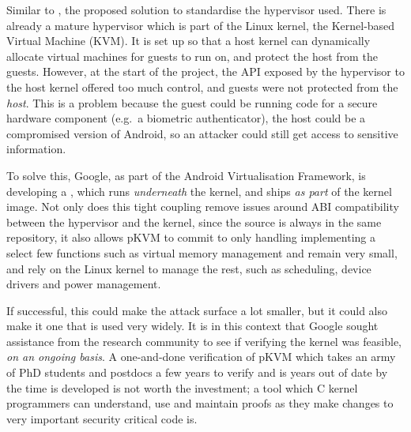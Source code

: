 Similar to , the proposed solution to standardise the hypervisor used. There
is already a mature hypervisor which is part of the Linux kernel, the
Kernel-based Virtual Machine (KVM)\@. It is set up so that a host kernel can
dynamically allocate virtual machines for guests to run on, and protect the
host from the guests. However, at the start of the project, the API exposed by
the hypervisor to the host kernel offered too much control, and guests were not
protected from the \emph{host}. This is a problem because the guest could be
running code for a secure hardware component (e.g.\ a biometric authenticator),
the host could be a compromised version of Android, so an attacker could still
get access to sensitive information.

To solve this, Google, as part of the Android Virtualisation
Framework,
is developing a , which
runs \emph{underneath} the kernel, and ships \emph{as part} of the kernel
image. Not only does this tight coupling remove issues around ABI compatibility
between the hypervisor and the kernel, since the source is always in the same
repository, it also allows pKVM to commit to only handling implementing a
select few functions such as virtual memory management and remain very small,
and rely on the Linux kernel to manage the rest, such as scheduling, device
drivers and power management.

If successful, this could make the attack surface a lot smaller, but it could
also make it one that is used very widely. It is in this context that Google
sought assistance from the research community to see if verifying the kernel
was feasible, \emph{on an ongoing basis}. A one-and-done verification of pKVM
which takes an army of PhD students and postdocs a few years to verify and is
years out of date by the time is developed is not worth the investment; a
tool which C kernel programmers can understand, use and maintain proofs as they
make changes to very important security critical code is.

